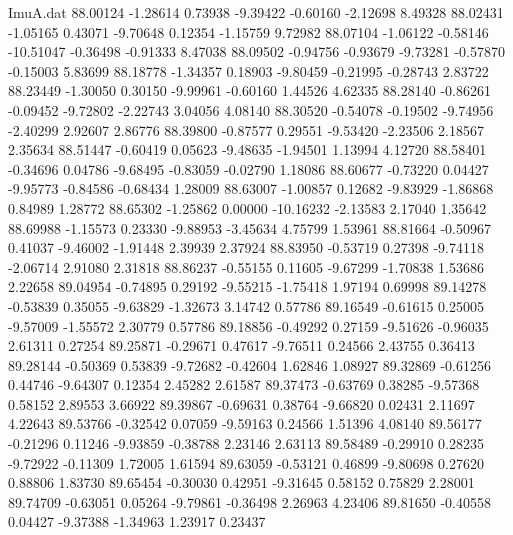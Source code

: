 \begin{filecontents}{ImuA.dat}
  88.00124   -1.28614    0.73938   -9.39422   -0.60160   -2.12698    8.49328
  88.02431   -1.05165    0.43071   -9.70648    0.12354   -1.15759    9.72982
  88.07104   -1.06122   -0.58146  -10.51047   -0.36498   -0.91333    8.47038
  88.09502   -0.94756   -0.93679   -9.73281   -0.57870   -0.15003    5.83699
  88.18778   -1.34357    0.18903   -9.80459   -0.21995   -0.28743    2.83722
  88.23449   -1.30050    0.30150   -9.99961   -0.60160    1.44526    4.62335
  88.28140   -0.86261   -0.09452   -9.72802   -2.22743    3.04056    4.08140
  88.30520   -0.54078   -0.19502   -9.74956   -2.40299    2.92607    2.86776
  88.39800   -0.87577    0.29551   -9.53420   -2.23506    2.18567    2.35634
  88.51447   -0.60419    0.05623   -9.48635   -1.94501    1.13994    4.12720
  88.58401   -0.34696    0.04786   -9.68495   -0.83059   -0.02790    1.18086
  88.60677   -0.73220    0.04427   -9.95773   -0.84586   -0.68434    1.28009
  88.63007   -1.00857    0.12682   -9.83929   -1.86868    0.84989    1.28772
  88.65302   -1.25862    0.00000  -10.16232   -2.13583    2.17040    1.35642
  88.69988   -1.15573    0.23330   -9.88953   -3.45634    4.75799    1.53961
  88.81664   -0.50967    0.41037   -9.46002   -1.91448    2.39939    2.37924
  88.83950   -0.53719    0.27398   -9.74118   -2.06714    2.91080    2.31818
  88.86237   -0.55155    0.11605   -9.67299   -1.70838    1.53686    2.22658
  89.04954   -0.74895    0.29192   -9.55215   -1.75418    1.97194    0.69998
  89.14278   -0.53839    0.35055   -9.63829   -1.32673    3.14742    0.57786
  89.16549   -0.61615    0.25005   -9.57009   -1.55572    2.30779    0.57786
  89.18856   -0.49292    0.27159   -9.51626   -0.96035    2.61311    0.27254
  89.25871   -0.29671    0.47617   -9.76511    0.24566    2.43755    0.36413
  89.28144   -0.50369    0.53839   -9.72682   -0.42604    1.62846    1.08927
  89.32869   -0.61256    0.44746   -9.64307    0.12354    2.45282    2.61587
  89.37473   -0.63769    0.38285   -9.57368    0.58152    2.89553    3.66922
  89.39867   -0.69631    0.38764   -9.66820    0.02431    2.11697    4.22643
  89.53766   -0.32542    0.07059   -9.59163    0.24566    1.51396    4.08140
  89.56177   -0.21296    0.11246   -9.93859   -0.38788    2.23146    2.63113
  89.58489   -0.29910    0.28235   -9.72922   -0.11309    1.72005    1.61594
  89.63059   -0.53121    0.46899   -9.80698    0.27620    0.88806    1.83730
  89.65454   -0.30030    0.42951   -9.31645    0.58152    0.75829    2.28001
  89.74709   -0.63051    0.05264   -9.79861   -0.36498    2.26963    4.23406
  89.81650   -0.40558    0.04427   -9.37388   -1.34963    1.23917    0.23437

\end{filecontents}
